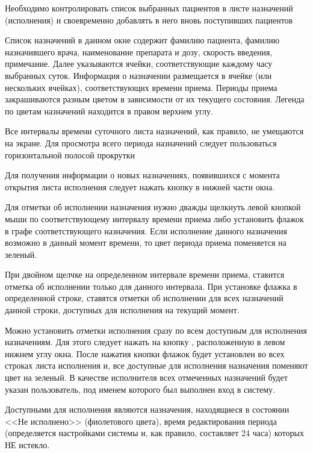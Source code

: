 \begin{vnim}
 Необходимо контролировать список выбранных пациентов в листе назначений (исполнения) и своевременно добавлять в него вновь поступивших пациентов
\end{vnim}
 
Список назначений в данном окне содержит фамилию пациента, фамилию назначившего врача, наименование препарата и дозу, скорость введения, примечание. Далее указываются ячейки, соответствующие каждому часу выбранных суток. Информация о назначении размещается в ячейке (или нескольких ячейках), соответствующих времени приема. Периоды приема закрашиваются разным цветом в зависимости от их текущего состояния. Легенда по  цветам назначений находится в правом верхнем углу.

\begin{vnim}
 Все интервалы времени суточного листа назначений, как правило, не умещаются на экране. Для просмотра всего периода назначений следует пользоваться горизонтальной полосой прокрутки
\end{vnim}

Для получения информации о новых назначениях, появившихся с момента открытия листа исполнения следует нажать кнопку   в нижней части окна.

Для отметки об исполнении назначения нужно дважды щелкнуть левой кнопкой мыши по соответствующему интервалу времени приема либо установить флажок в графе  соответствующего назначения. Если исполнение данного назначения возможно в данный момент времени, то цвет периода приема поменяется на зеленый.

При двойном щелчке на определенном интервале времени приема, ставится отметка об исполнении только для данного интервала. При установке флажка  в определенной строке, ставятся отметки об исполнении для всех назначений данной строки, доступных для исполнения на текущий момент.

Можно установить отметки исполнения сразу по всем доступным для исполнения назначениям. Для этого следует нажать на кнопку , расположенную в левом нижнем углу окна. После нажатия кнопки флажок  будет установлен во всех строках листа исполнения и, все доступные для исполнения назначения поменяют цвет на зеленый. В качестве исполнителя всех отмеченных назначений будет указан пользователь, под именем которого был выполнен вход в систему.

Доступными для исполнения являются назначения, находящиеся в состоянии <<Не исполнено>> (фиолетового цвета), время редактирования периода (определяется настройками системы и, как правило, составляет 24 часа) которых НЕ истекло.

